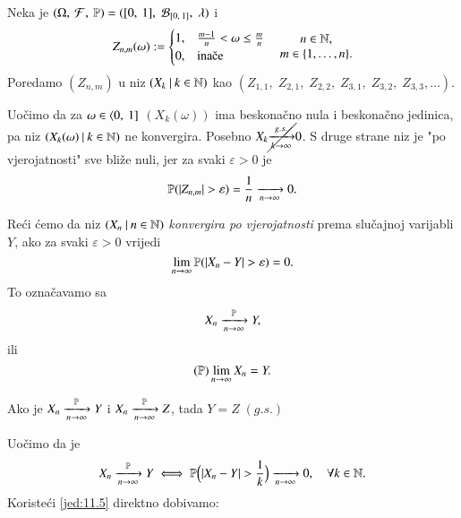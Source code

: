\begin{pr}  \label{pr:11.13}
    Neka je $(\Omega, \: \mathcal{F}, \: \mathbb{P}) = ([{0}, \:{1}], \; \mathcal{B}_{[{0}, \:{1}]}, \; \lambda)$ i
    \begin{equation*}
        Z_{n, m} (\omega) :=
        \begin{cases}
            1, &\frac{m-1}{n} < \omega \leq \frac{m}{n}\\
            0, &\textnormal{ina\v ce}
        \end{cases}
        \quad
        \begin{matrix}
            n \in \nat,\\
            m \in \{ 1, \ldots, n \}.
        \end{matrix}
    \end{equation*}
    Poredamo $(Z_{n, m})$ u niz $({X_k} \: | \: {k \in \mathbb{N}})$ kao $(Z_{1,1}, \; Z_{2,1}, \; Z_{2, 2}, \; Z_{3,1}, \; Z_{3,2}, \; Z_{3,3}, \ldots)$.

    Uo\v cimo da za $\omega \in \langle {0}, \: {1}]$ $(X_k (\omega))$ ima beskona\v cno nula i beskona\v cno jedinica, pa niz $({X_k (\omega)} \: | \: {k \in \mathbb{N}})$ ne konvergira.
    Posebno $X_k \cancel{\xrightarrow[k \to \infty]{g.s.}} 0$.
    S druge strane niz je "po vjerojatnosti" sve bli\v ze nuli, jer za svaki $\varepsilon > 0$ je
    \begin{equation*}
        \mathbb{P}({|Z_{n, m}| > \varepsilon}) = \frac{1}{n} \xrightarrow[n \to \infty]{} 0.
    \end{equation*} 
\end{pr}

\begin{defn}    \label{defn:11.13-1}
    Re\' ci \' cemo da niz $({X_n} \: | \: {n \in \mathbb{N}})$ \emph{konvergira po vjerojatnosti} prema slu\v cajnoj varijabli $Y$, ako za svaki $\varepsilon > 0$ vrijedi
    \begin{equation*}
        \lim\limits_{n \to \infty} \mathbb{P}({|X_n - Y| > \varepsilon}) = 0.
    \end{equation*}
    To ozna\v cavamo sa
    \begin{equation*}
        X_n \xrightarrow[n \to \infty]{\mathbb{P}} Y,
    \end{equation*}
    ili
    \begin{equation*}
        (\mathbb{P}) \lim\limits_{n \to \infty} X_n = Y.
    \end{equation*}
\end{defn}

\begin{zad} \label{zad:11.14}
    Ako je $X_n \xrightarrow[n \to \infty]{\mathbb{P}} Y$ i $X_n \xrightarrow[n \to \infty]{\mathbb{P}} Z$, tada $Y =  Z \; (g.s.)$
\end{zad}
Uo\v cimo da je
\begin{equation}    \label{jed:11.15}
    X_n \xrightarrow[n \to \infty]{\mathbb{P}} Y \iff \mathbb{P} \Big( |X_n - Y| > \frac{1}{k} \Big) \xrightarrow[n \to \infty]{} 0, \quad \forall k \in \mathbb{N}.
\end{equation}
Koriste\' ci \eqref{jed:11.5} direktno dobivamo:


